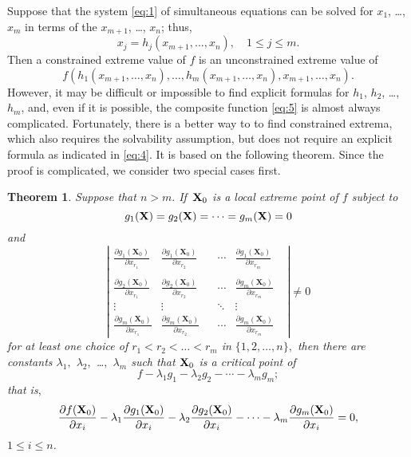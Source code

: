 \documentclass{article}
\newtheorem{theorem}{Theorem}
\newcommand{\pd}[2]{\frac{\partial{#1}}{\partial{#2}}}
\newcommand{\dst}{\displaystyle}
\begin{document}
Suppose that the
 system \eqref{eq:1} of simultaneous equations  can be
solved for
  $x_{1}$,  \dots, $x_{m}$
in terms of the  $x_{m+1}$, \dots, $x_{n}$; thus,
\begin{equation} \label{eq:4}
x_{j}=h_{j}(x_{m+1},\dots,x_{n}),\quad 1\le j\le m.
\end{equation}
Then a constrained extreme value  of $f$
 is an unconstrained extreme value of
\begin{equation} \label{eq:5}
f(h_{1}(x_{m+1},\dots,x_{n}),\dots,h_{m}(x_{m+1},\dots,x_{n}),x_{m+1},\dots,x_{n}).
\end{equation}
However, it may be  difficult or  impossible to find
explicit formulas for $h_{1}$, $h_{2}$, \dots, $h_{m}$,
 and,  even if it is
possible, the composite function \eqref{eq:5} is almost always
complicated.  Fortunately, there is a better way to to find constrained
extrema, which also requires the solvability assumption,  but does
not require an explicit formula as indicated in  \eqref{eq:4}.   It is
based on
the following theorem. Since the proof is complicated, we  consider two
special cases first.


\begin{theorem} \label{theorem:1}
Suppose that  $n>m.$    If\,  ${\bf X}_{0}$ is a local  extreme point of
$f$
subject to
$$
g_{1}({\bf X})=g_{2}({\bf X})=\cdots =g_{m}({\bf X})=0
$$
and
\begin{equation} \label{eq:6}
\left|\begin{array}{ccccccc}
\dst{\pd{g_{1}(\mathbf{X}_{0})}{x_{r_{1}}}} &
\dst{\pd{g_{1}(\mathbf{X}_{0})}{x_{r_{2}}}}&
&\cdots &
\dst{\pd{g_{1}(\mathbf{X}_{0})}{x_{r_{m}}}} \\\\
\dst{\pd{g_{2}(\mathbf{X}_{0})}{x_{r_{1}}}} &
\dst{\pd{g_{2}(\mathbf{X}_{0})}{x_{r_{2}}}}&
&\cdots &
\dst{\pd{g_{m}(\mathbf{X}_{0})}{x_{r_{m}}}} & \\
 \vdots & \vdots &&\ddots&\vdots\\
\dst{\pd{g_{m}(\mathbf{X}_{0})}{x_{r_{1}}}} &
\dst{\pd{g_{m}(\mathbf{X}_{0})}{x_{r_{2}}}}&
&\cdots &
\dst{\pd{g_{m}(\mathbf{X}_{0})}{x_{r_{m}}}} &
\end{array}\right|\ne0
\end{equation}
for at least one choice of
$r_{1}<r_{2}<\dots <r_{m}$ in $\{1,2,\dots,n\},$ then there are constants
$\lambda_{1},$ $\lambda_{2},$ \dots$,$ $\lambda_{m}$ such that
${\bf X}_{0}$
is a critical point of
$$
f-\lambda_{1}g_{1}-\lambda_{2}g_{2}-\cdots-\lambda_{m} g_{m};
$$
that is$,$
$$
\frac{\partial{f({\bf X}_{0})}}{\partial x_{i}}
-\lambda_{1}\frac{\partial{g_{1}({\bf X}_{0})}}{\partial x_{i}}
-\lambda_{2}\frac{\partial{g_{2}({\bf X}_{0})}}{\partial x_{i}}-\cdots
-\lambda_{m}\frac{\partial{g_{m}({\bf X}_{0})}}{\partial x_{i}}=0,
$$
$1\le i\le n$.
\end{theorem}
\end{document}
